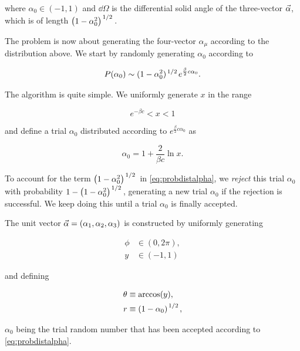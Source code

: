 \documentclass[reqno,12pt]{article}
\numberwithin{equation}{section}
\begin{document}
where $\alpha_0 \in (-1,1)$ and $\dd{\Omega}$ is the differential solid angle of the three-vector $\va{\alpha}$,
which is of length $\qty(1 - \alpha_0^2)^{\flatfrac{1}{2}}$.

The problem is now about generating the four-vector $\alpha_\mu$ according to the distribution above.
We start by randomly generating $\alpha_0$ according to

\begin{equation} \label{eq:probdistalpha}
	P(\alpha_0) \sim (1 - \alpha_0^2)^{\flatfrac{1}{2}} e^{\frac{\beta}{2}c\alpha_0}.
\end{equation}

The algorithm is quite simple. We uniformly generate $x$ in the range 

\begin{equation}
	e^{-\beta c} < x < 1
\end{equation} 

and define a trial $\alpha_0$ distributed according to $e^{\frac{\beta}{2}c\alpha_0}$ as

\begin{equation}
	\alpha_0 = 1 + \frac{2}{\beta c}\ln{x}.
\end{equation}

To account for the term $\qty(1 - \alpha_0^2)^{\flatfrac{1}{2}}$ in \eqref{eq:probdistalpha}, we \textit{reject} this trial
$\alpha_0$ with probability $1 - \qty(1 - \alpha_0^2)^{\flatfrac{1}{2}}$, generating a new trial $\alpha_0$ if 
the rejection is successful. We keep doing this until a trial $\alpha_0$ is finally accepted. 

The unit vector $\va{\alpha} = (\alpha_1, \alpha_2, \alpha_3)$ is constructed by uniformly generating 

\begin{equation}
	\begin{aligned}
		\phi &\in (0, 2\pi), \\
		y &\in (-1, 1)
	\end{aligned}
\end{equation}

and defining 

\begin{equation}
	\begin{aligned}
		\theta &\equiv \arccos(y), \\
		r &\equiv \qty(1 - \alpha_0)^{\flatfrac{1}{2}},
	\end{aligned}
\end{equation}

$\alpha_0$ being the trial random number that has been accepted according to \eqref{eq:probdistalpha}. 
\end{document}
